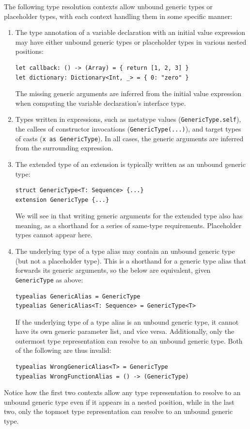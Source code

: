 \documentclass[../generics]{subfiles}
\begin{document}
The following type resolution contexts allow unbound generic types or placeholder types, with each context handling them in some specific manner:
\begin{enumerate}

\item The type annotation of a variable declaration with an initial value expression may have either unbound generic types or placeholder types in various nested positions:
\begin{Verbatim}
let callback: () -> (Array) = { return [1, 2, 3] }
let dictionary: Dictionary<Int, _> = { 0: "zero" }
\end{Verbatim}
The missing generic arguments are inferred from the initial value expression when computing the variable declaration's interface type.

\item Types written in expressions, such as metatype values (\texttt{GenericType.self}), the callees of constructor invocations (\texttt{GenericType(...)}), and target types of casts (\texttt{x as GenericType}). In all cases, the generic arguments are inferred from the surrounding expression.

\item The extended type of an extension is typically written as an unbound generic type:
\begin{Verbatim}
struct GenericType<T: Sequence> {...}
extension GenericType {...}
\end{Verbatim}
We will see in  that writing generic arguments for the extended type also has meaning, as a shorthand for a series of same-type requirements. Placeholder types cannot appear here.

\item The underlying type of a type alias may contain an unbound generic type (but not a placeholder type). This is a shorthand for a generic type alias that forwards its generic arguments, so the below are equivalent, given \texttt{GenericType} as above:
\begin{Verbatim}
typealias GenericAlias = GenericType
typealias GenericAlias<T: Sequence> = GenericType<T>
\end{Verbatim}
If the underlying type of a type alias is an unbound generic type, it cannot have its own generic parameter list, and vice versa. Additionally, only the outermost type representation can resolve to an unbound generic type. Both of the following are thus invalid:
\begin{Verbatim}
typealias WrongGenericAlias<T> = GenericType
typealias WrongFunctionAlias = () -> (GenericType)
\end{Verbatim}
\end{enumerate}
Notice how the first two contexts allow any type representation to resolve to an unbound generic type even if it appears in a nested position, while in the last two, only the topmost type representation can resolve to an unbound generic type.
\end{document}
